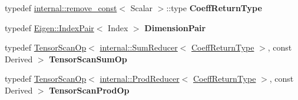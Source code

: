 \begin{DoxyCompactItemize}
typedef \hyperlink{struct_eigen_1_1internal_1_1remove__const}{internal\+::remove\+\_\+const}$<$ Scalar $>$\+::type {\bfseries Coeff\+Return\+Type}
\item 
\mbox{\label{class_eigen_1_1_tensor_base_3_01_derived_00_01_read_only_accessors_01_4_a2a36349a2c90ff790ca85541f8c16b85}} 
typedef \hyperlink{struct_eigen_1_1_index_pair}{Eigen\+::\+Index\+Pair}$<$ Index $>$ {\bfseries Dimension\+Pair}
\item 
\mbox{\label{class_eigen_1_1_tensor_base_3_01_derived_00_01_read_only_accessors_01_4_a4a5580f3a3fe12f172ab97fdc267ec18}} 
typedef \hyperlink{class_eigen_1_1_tensor_scan_op}{Tensor\+Scan\+Op}$<$ \hyperlink{struct_eigen_1_1internal_1_1_sum_reducer}{internal\+::\+Sum\+Reducer}$<$ \hyperlink{group___sparse_core___module}{Coeff\+Return\+Type} $>$, const Derived $>$ {\bfseries Tensor\+Scan\+Sum\+Op}
\item 
\mbox{\label{class_eigen_1_1_tensor_base_3_01_derived_00_01_read_only_accessors_01_4_a3642e0305d8771a6c582afae66a959f6}} 
typedef \hyperlink{class_eigen_1_1_tensor_scan_op}{Tensor\+Scan\+Op}$<$ \hyperlink{struct_eigen_1_1internal_1_1_prod_reducer}{internal\+::\+Prod\+Reducer}$<$ \hyperlink{group___sparse_core___module}{Coeff\+Return\+Type} $>$, const Derived $>$ {\bfseries Tensor\+Scan\+Prod\+Op}
\end{DoxyCompactItemize}
